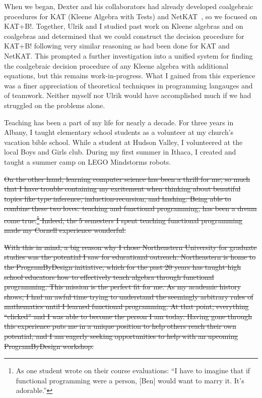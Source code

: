 \documentclass[12pt]{article}
\newcommand{\hdr}[2]{\vspace{-0.4cm}{\flushleft{\hrulefill\\\textbf{#1}\hfill{#2}\\\vspace{-0.2cm}\hrulefill}}\vspace{0.1cm}}
\begin{document}
When we began, Dexter and his collaborators had already developed coalgebraic procedures for KAT (Kleene Algebra with Tests) and NetKAT~\cite{foster2014coalgebraic}, so we focused on KAT+B!.
Together, Ulrik and I studied past work on Kleene algebras and on coalgebras and determined that we could construct the decision procedure for KAT+B! following very similar reasoning as had been done for KAT and NetKAT.
This prompted a further investigation into a unified system for finding the coalgebraic decision procedure of any Kleene algebra with additional equations, but this remains work-in-progress.
What I gained from this experience was a finer appreciation of theoretical techniques in programming langauges and of teamwork.
Neither myself nor Ulrik would have accomplished much if we had struggled on the problems alone.

\hdr{Broader Impacts}{}

Teaching has been a part of my life for nearly a decade.
For three years in Albany, I taught elementary school students as a volunteer at my church's vacation bible school.
While a student at Hudson Valley, I volunteered at the local Boys and Girls club.
During my first summer in Ithaca, I created and taught a summer camp on LEGO Mindstorms robots.

\st{On the other hand, learning computer science has been a thrill for me, so much that I have trouble containing my excitement when thinking about beautiful topics like type inference, induction-recursion, and hashing.
Being able to combine these two loves: teaching and functional programming, has been a dream come true.\footnote{As one student wrote on their course evaluations: ``I have to imagine that if functional programming were a person, [Ben] would want to marry it. It's adorable.''}
Indeed, the 5 semesters I spent teaching functional programming made my Cornell experience wonderful.}

\st{With this in mind, a big reason why I chose Northeastern University for graduate studies was the potential I saw for educational outreach.
Northeastern is home to the ProgramByDesign initiative, which for the past 20 years has taught high school educators how to effectively teach algebra through functional programming.
This mission is the perfect fit for me.
As my academic history shows, I had an awful time trying to understand the seemingly arbitrary rules of mathematics until I learned functional programming.
At that point, everything ``clicked'' and I was able to become the person I am today.
Having gone through this experience puts me in a unique position to help others reach their own potential, and I am eagerly seeking opportunities to help with an upcoming ProgramByDesign workshop.}

\vfill
\renewcommand{\section}[2]{}
\begin{multicols}{2}
\footnotesize


\end{multicols}
\end{document}
